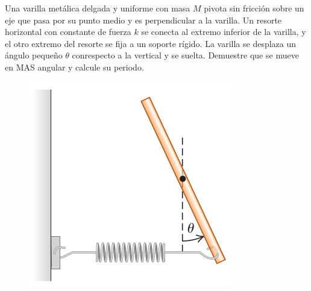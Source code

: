 \begin{mdframed}[style=warning]
	\begin{ejercicio}
		Una varilla metálica delgada y uniforme con masa $M$ pivota sin fricción sobre un eje que pasa por su punto medio y es perpendicular a la varilla. Un resorte horizontal con constante de fuerza $k$ se conecta al extremo inferior de la varilla, y el otro extremo del resorte se fija a un soporte rígido. La varilla se desplaza un ángulo pequeño $\theta$ conrespecto a la vertical y se suelta. Demuestre que se mueve en MAS angular y calcule su periodo.
		
		\begin{figure}[H]
			\centering
			\includegraphics[scale=0.3]{./img/ej1.png}
		\end{figure}
	\end{ejercicio}
\end{mdframed}






















